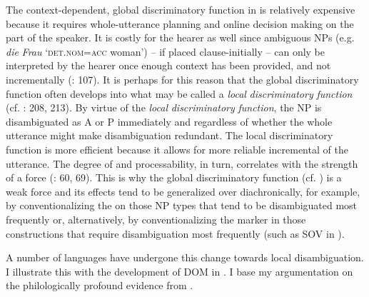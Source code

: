 \documentclass[output=paper]{langsci/langscibook}
\begin{document}
The context-dependent, global discriminatory function in  is relatively expensive  because it requires whole-utterance planning and online decision making on the part of the speaker. It is costly for the hearer as well since ambiguous NPs (e.g.  \textit{die} \textit{Frau} ‘\textsc{det.nom=acc} woman’) – if placed clause-initially – can only be interpreted by the hearer once enough context has been provided, and not incrementally (\citealt{Bornkessel-SchlesewskySchlesewsky2014}: 107). It is perhaps for this reason that the global discriminatory function often develops into what may be called a \textit{local} \textit{discriminatory} \textit{function} (cf. \citealt{Aissen2003,ZeevatJäger2002,Jäger2004,Malchukov2008}: 208, 213). By virtue of the \textit{local} \textit{discriminatory} \textit{function}, the NP is disambiguated as A or P immediately and regardless of whether the whole utterance might make disambiguation redundant. The local discriminatory function is more efficient because it allows for more reliable incremental  of the utterance. The degree of  and processability, in turn, correlates with the strength of a force (\citealt{Hawkins2014_CompMot}: 60, 69). This is why the global discriminatory function (cf. ) is a weak force and its effects tend to be generalized over diachronically, for example, by conventionalizing the  on those NP types that tend to be disambiguated most frequently or, alternatively, by conventionalizing the marker in those constructions that require disambiguation most frequently (such as SOV in ). 

A number of languages have undergone this change towards local disambiguation. I illustrate this with the development of DOM in . I base my argumentation on the philologically profound evidence from \citet{Krysko1994_Russ,Krysko1997_Russ}. 
\end{document}

